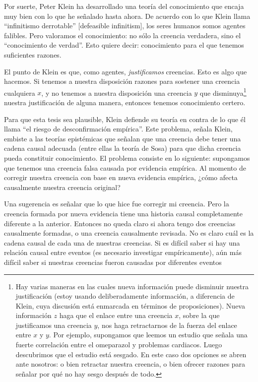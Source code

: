 \documentclass{article}
\begin{document}
Por suerte, Peter Klein \citeyear{Klein2019} ha desarrollado una teoría del conocimiento que encaja muy bien con lo que he señalado hasta ahora. De acuerdo con lo que Klein llama ``infinitismo derrotable'' [defeasible infinitism], los seres humanos somos agentes falibles. Pero valoramos el conocimiento: no sólo la creencia verdadera, sino el ``conocimiento de verdad''. Esto quiere decir: conocimiento para el que tenemos suficientes razones.

El punto de Klein es que, como agentes, \textit{justificamos} creencias. Esto es algo que hacemos. Si tenemos a nuestra disposición razones para sostener una creencia cualquiera $x$, y no tenemos a nuestra disposición una creencia $y$ que disminuya\footnote{Hay varias maneras en las cuales nueva información puede disminuir nuestra justificación (estoy usando deliberadamente información, a diferencia de Klein, cuya discusión está enmarcada en términos de proposiciones). Nueva información $z$ haga que el enlace entre una creencia $x$, sobre la que justificamos una creencia $y$, nos haga retractarnos de la fuerza del enlace entre $x$ y $y$. Por ejemplo, supongamos que leemos un estudio que señala una fuerte correlación entre el omeparazol y problemas cardiacos. Luego descubrimos que el estudio está sesgado. En este caso dos opciones se abren ante nosotros: o bien retractar nuestra creencia, o bien ofrecer razones para señalar por qué no hay sesgo después de todo.} nuestra justificación de alguna manera, entonces tenemos conocimiento certero.

Para que esta tesis sea plausible, Klein defiende su teoría en contra de lo que él llama ``el riesgo de desconfirmación empírica''. Este problema, señala Klein, embiste a las teorías epistémicas que señalan que una creencia debe tener una cadena causal adecuada (entre ellas la teoría de Sosa) para que dicha creencia pueda constituir conocimiento. El problema consiste en lo siguiente: supongamos que tenemos una creencia falsa causada por evidencia empírica. Al momento de corregir nuestra creencia con base en nueva evidencia empírica, ¿cómo afecta causalmente nuestra creencia original?

Una sugerencia es señalar que lo que hice fue corregir mi creencia. Pero la creencia formada por nueva evidencia tiene una historia causal completamente diferente a la anterior. Entonces no queda claro si ahora tengo dos creencias causalmente formadas, o una creencia causalmente revisada. No es claro cuál es la cadena causal de cada una de nuestras creencias. Si es difícil saber si hay una relación causal entre eventos (es necesario investigar empíricamente), aún más difícil saber si nuestras creencias fueron causadas por diferentes eventos 
\end{document}
